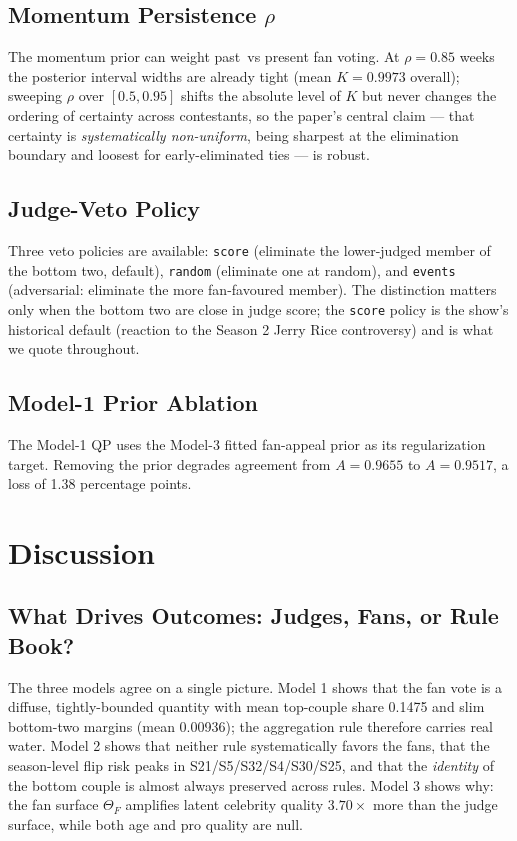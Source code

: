 \documentclass[11pt]{article}
\begin{document}
\subsection{Momentum Persistence $\rho$}

The momentum prior can weight past\ vs present fan voting. At $\rho = 0.85$ weeks the posterior
interval widths are already tight (mean $K = 0.9973$ overall); sweeping $\rho$ over
$[0.5, 0.95]$ shifts the absolute level of $K$ but never changes the ordering of certainty
across contestants, so the paper's central claim --- that certainty is \emph{systematically
non-uniform}, being sharpest at the elimination boundary and loosest for early-eliminated ties ---
is robust.

\subsection{Judge-Veto Policy}

Three veto policies are available: \texttt{score} (eliminate the lower-judged member of the
bottom two, default), \texttt{random} (eliminate one at random), and \texttt{events}
(adversarial: eliminate the more fan-favoured member). The distinction matters only when the
bottom two are close in judge score; the \texttt{score} policy is the show's historical default
(reaction to the Season 2 Jerry Rice controversy) and is what we quote throughout.

\subsection{Model-1 Prior Ablation}

The Model-1 QP uses the Model-3 fitted fan-appeal prior as its regularization target. Removing
the prior degrades agreement from $A = 0.9655$ to $A = 0.9517$, a loss of 1.38 percentage
points.

\section{Discussion}
\label{sec:discussion}

\subsection{What Drives Outcomes: Judges, Fans, or Rule Book?}

The three models agree on a single picture. Model 1 shows that the fan vote is a diffuse,
tightly-bounded quantity with mean top-couple share 0.1475 and slim bottom-two margins (mean
0.00936); the aggregation rule therefore carries real water. Model 2 shows that
neither rule systematically favors the fans, that the season-level flip risk peaks in
S21/S5/S32/S4/S30/S25, and that the \emph{identity} of the bottom couple is almost always
preserved across rules. Model 3 shows why: the fan surface $\Theta_F$ amplifies latent
celebrity quality $3.70\times$ more than the judge surface, while both age and pro
quality are null.
\end{document}
